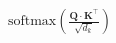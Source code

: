 \documentclass[preview]{standalone}
\begin{document}
\begin{align*}
\text{softmax}\left( \frac{\mathbf{Q} \cdot \mathbf{K}^\top}{\sqrt{d_k}} \right)
\end{align*}
\end{document}
